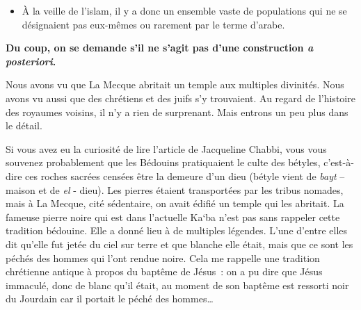 \begin{itemize}
\item
  À la veille de l'islam, il y a donc un ensemble vaste de populations
  qui ne se désignaient pas eux-mêmes ou rarement par le terme d'arabe.
\end{itemize}

\textbf{Du coup, on se demande s'il ne s'agit pas d'une construction
\emph{a posteriori}.}


Nous avons vu que La Mecque abritait un temple aux multiples divinités.
Nous avons vu aussi que des chrétiens et des juifs s'y trouvaient. Au
regard de l'histoire des royaumes voisins, il n'y a rien de surprenant.
Mais entrons un peu plus dans le détail.


Si vous avez eu la curiosité de lire l'article de Jacqueline Chabbi,
vous vous souvenez probablement que les Bédouins pratiquaient le culte
des bétyles, c'est-à-dire ces roches sacrées censées être la demeure
d'un dieu (bétyle vient de \emph{bayt} -- maison et de \emph{el} -
dieu). Les pierres étaient transportées par les tribus nomades, mais à
La Mecque, cité sédentaire, on avait édifié un temple qui les abritait.
La fameuse pierre noire qui est dans l'actuelle Ka`ba n'est pas sans
rappeler cette tradition bédouine. Elle a donné lieu à de multiples
légendes. L'une d'entre elles dit qu'elle fut jetée du ciel sur terre et
que blanche elle était, mais que ce sont les péchés des hommes qui l'ont
rendue noire. Cela me rappelle une tradition chrétienne antique à propos
du baptême de Jésus~: on a pu dire que Jésus immaculé, donc de blanc
qu'il était, au moment de son baptême est ressorti noir du Jourdain car
il portait le péché des hommes\ldots{}

